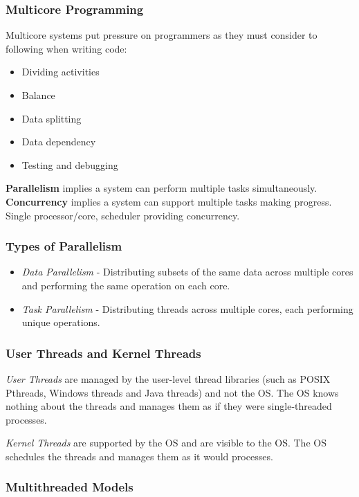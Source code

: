 \documentclass[]{article}
\begin{document}
\subsubsection*{Multicore Programming}

Multicore systems put pressure on programmers as they must consider to following when writing code:

\begin{itemize}
    \item Dividing activities
    \item Balance 
    \item Data splitting
    \item Data dependency
    \item Testing and debugging
\end{itemize}

\textbf{Parallelism} implies a system can perform multiple tasks simultaneously. \textbf{Concurrency} implies a system can support multiple tasks making progress. Single processor/core, scheduler providing concurrency.

\subsubsection*{Types of Parallelism}
\begin{itemize}
    \item \emph{Data Parallelism} - Distributing subsets of the same data across multiple cores and performing the same operation on each core.
    \item \emph{Task Parallelism} - Distributing threads across multiple cores, each performing unique operations.
\end{itemize}

\subsubsection*{User Threads and Kernel Threads}

\emph{User Threads} are managed by the user-level thread libraries (such as POSIX Pthreads, Windows threads and Java threads) and not the OS. The OS knows nothing about the threads and manages them as if they were single-threaded processes.

\emph{Kernel Threads} are supported by the OS and are visible to the OS. The OS schedules the threads and manages them as it would processes.

\subsubsection*{Multithreaded Models}
\end{document}
